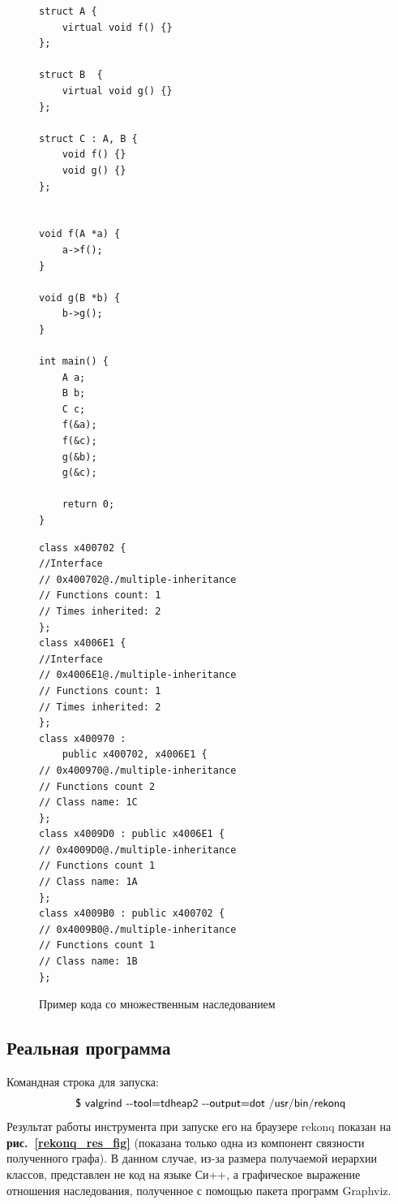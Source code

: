 \documentclass[a4paper,12pt,russian]{article}
\newcommand{\picref}[1]{\textbf{рис.~\ref{#1}}}
\newcommand{\code}[1]{\textsf{#1}}
\begin{document}
\begin{figure}[h!]
\begin{minipage}[t]{0.45\linewidth}
\caption*{Исходная программа}
\begin{lstlisting}
struct A {
    virtual void f() {}
};

struct B  {
    virtual void g() {}
};

struct C : A, B {
    void f() {}
    void g() {}
};


void f(A *a) {
    a->f();
}

void g(B *b) {
    b->g();
}

int main() {
    A a;
    B b;
    C c;
    f(&a);
    f(&c);
    g(&b);
    g(&c);

    return 0;
}
\end{lstlisting}
\end{minipage}
\begin{minipage}[t]{0.55\linewidth}
\caption*{Результат работы инструмента}
\begin{lstlisting}
class x400702 {
//Interface
// 0x400702@./multiple-inheritance
// Functions count: 1
// Times inherited: 2
};
class x4006E1 {
//Interface
// 0x4006E1@./multiple-inheritance
// Functions count: 1
// Times inherited: 2
};
class x400970 :
    public x400702, x4006E1 {
// 0x400970@./multiple-inheritance
// Functions count 2
// Class name: 1C
};
class x4009D0 : public x4006E1 {
// 0x4009D0@./multiple-inheritance
// Functions count 1
// Class name: 1A
};
class x4009B0 : public x400702 {
// 0x4009B0@./multiple-inheritance
// Functions count 1
// Class name: 1B
};
\end{lstlisting}
\end{minipage}
\caption{Пример кода со множественным наследованием}
\label{multiple_inheritance_ex_lst}
\end{figure}

\subsection{Реальная программа}
Командная строка для запуска:
\[\mbox{\code{\$ valgrind -{}-tool=tdheap2 -{}-output=dot /usr/bin/rekonq}}\]
Результат работы инструмента при запуске его на браузере \code{rekonq} \cite{rekonq} показан на \picref{rekonq_res_fig} (показана только одна из компонент связности полученного графа).
В данном случае, из-за размера получаемой иерархии классов, представлен не код на языке Си++, а графическое выражение отношения наследования, полученное с помощью пакета программ \code{Graphviz}.
\end{document}
